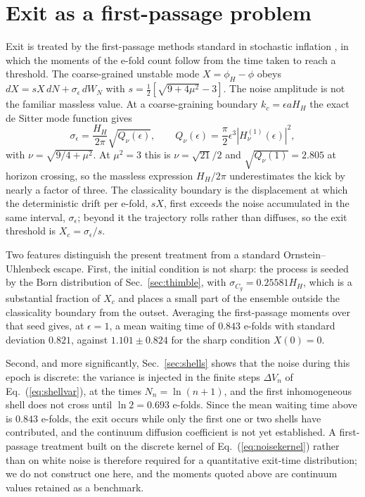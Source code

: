 \documentclass[aps,prd,twocolumn,superscriptaddress,nofootinbib,longbibliography]{revtex4-2}
\begin{document}
\section{Exit as a first-passage problem}
\label{sec:exit}
Exit is treated by the first-passage methods standard in stochastic
inflation \cite{VenninStarobinsky2015}, in which the moments of the
e-fold count follow from the time taken to reach a threshold. The
coarse-grained unstable mode $X=\phi_H-\phi$ obeys
$dX=sX\,dN+\sigma_\epsilon\,dW_N$ with $s=\tfrac12[\sqrt{9+4\mu^2}-3]$. The
noise amplitude is not the familiar massless value. At a coarse-graining
boundary $k_c=\epsilon aH_H$ the exact de Sitter mode function gives
\begin{equation}
\sigma_\epsilon=\frac{H_H}{2\pi}\sqrt{Q_\nu(\epsilon)},
\qquad
Q_\nu(\epsilon)=\frac{\pi}{2}\epsilon^3\left|H^{(1)}_\nu(\epsilon)\right|^2,
\label{eq:kick}
\end{equation}
with $\nu=\sqrt{9/4+\mu^2}$. At $\mu^2=3$ this is $\nu=\sqrt{21}/2$ and
$\sqrt{Q_\nu(1)}=2.805$ at horizon crossing, so the massless expression
$H_H/2\pi$ underestimates the kick by nearly a factor of three. The
classicality boundary is the displacement at which the deterministic drift
per e-fold, $sX$, first exceeds the noise accumulated in the same interval,
$\sigma_\epsilon$; beyond it the trajectory rolls rather than diffuses, so
the exit threshold is $X_c=\sigma_\epsilon/s$.

Two features distinguish the present treatment from a standard
Ornstein--Uhlenbeck escape. First, the initial condition is not sharp: the
process is seeded by the Born distribution of Sec.~\ref{sec:thimble}, with
$\sigma_{C_g}=0.25581H_H$, which is a substantial fraction of $X_c$ and
places a small part of the ensemble outside the classicality boundary from
the outset. Averaging the first-passage moments over that seed gives, at
$\epsilon=1$, a mean waiting time of $0.843$ e-folds with standard deviation
$0.821$, against $1.101\pm0.824$ for the sharp condition $X(0)=0$.

Second, and more significantly, Sec.~\ref{sec:shells} shows that the noise
during this epoch is discrete: the variance is injected in the finite
steps $\Delta V_n$ of Eq.~(\ref{eq:shellvar}), at the times
$N_n=\ln(n+1)$, and the first inhomogeneous shell does not cross until
$\ln2=0.693$ e-folds. Since the mean waiting time above is $0.843$
e-folds, the exit occurs while only the first one or two shells have
contributed, and the continuum diffusion coefficient is not yet
established. A first-passage treatment built on the discrete kernel of
Eq.~(\ref{eq:noisekernel}) rather than on white noise is therefore
required for a quantitative exit-time distribution; we do not construct
one here, and the moments quoted above are continuum values retained as
a benchmark.
\end{document}
